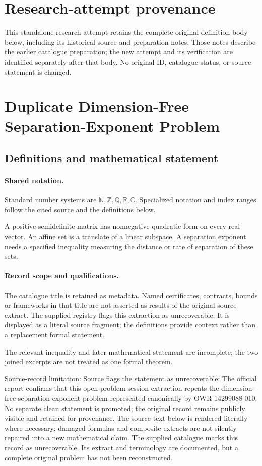 \documentclass[11pt]{article}
\begin{document}
\section*{Research-attempt provenance}
This standalone research attempt retains the complete original definition body below,
including its historical source and preparation notes. Those notes describe the
earlier catalogue preparation; the new attempt and its verification are identified
separately after that body. No original ID, catalogue status, or source statement is changed.

\section{Duplicate Dimension-Free Separation-Exponent Problem}\label{statement}

\subsection{Definitions and mathematical statement}

\paragraph{Shared notation.}Standard number systems are $\mathbb N,\mathbb Z,\mathbb Q,\mathbb R,\mathbb C$. Specialized notation and index ranges follow the cited source and the definitions below.


A positive-semidefinite matrix has nonnegative quadratic form on every real vector. An affine set is a translate of a linear subspace. A separation exponent needs a specified inequality measuring the distance or rate of separation of these sets.
\paragraph{Record scope and qualifications.}
The catalogue title is retained as metadata. Named certificates, contracts, bounds or frameworks in that title are not asserted as results of the original source extract.
The supplied registry flags this extraction as unrecoverable. It is displayed as a literal source fragment; the definitions provide context rather than a replacement formal statement.

The relevant inequality and later mathematical statement are incomplete; the two joined excerpts are not treated as one formal theorem.

Source-record limitation: Source flags the statement as unrecoverable: The official report confirms that this open-problem-session extraction repeats the dimension-free separation-exponent problem represented canonically by OWR-14299088-010. No separate clean statement is promoted; the original record remains publicly visible and retained for provenance.
The source text below is rendered literally where necessary; damaged formulas and composite extracts are not silently repaired into a new mathematical claim.
The supplied catalogue marks this record as unrecoverable. Its extract and terminology are documented, but a complete original problem has not been reconstructed.
\end{document}
